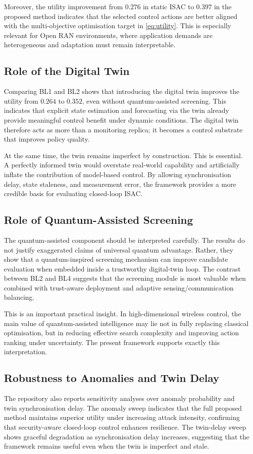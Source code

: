 \documentclass[10pt,journal]{IEEEtran}
\begin{document}
Moreover, the utility improvement from \(0.276\) in static ISAC to \(0.397\) in the proposed method indicates that the selected control actions are better aligned with the multi-objective optimisation target in \eqref{eq:utility}. This is especially relevant for Open RAN environments, where application demands are heterogeneous and adaptation must remain interpretable.

\subsection{Role of the Digital Twin}
Comparing BL1 and BL2 shows that introducing the digital twin improves the utility from \(0.264\) to \(0.352\), even without quantum-assisted screening. This indicates that explicit state estimation and forecasting via the twin already provide meaningful control benefit under dynamic conditions. The digital twin therefore acts as more than a monitoring replica; it becomes a control substrate that improves policy quality.

At the same time, the twin remains imperfect by construction. This is essential. A perfectly informed twin would overstate real-world capability and artificially inflate the contribution of model-based control. By allowing synchronisation delay, state staleness, and measurement error, the framework provides a more credible basis for evaluating closed-loop ISAC.

\subsection{Role of Quantum-Assisted Screening}
The quantum-assisted component should be interpreted carefully. The results do not justify exaggerated claims of universal quantum advantage. Rather, they show that a quantum-inspired screening mechanism can improve candidate evaluation when embedded inside a trustworthy digital-twin loop. The contrast between BL2 and BL4 suggests that the screening module is most valuable when combined with trust-aware deployment and adaptive sensing/communication balancing.

This is an important practical insight. In high-dimensional wireless control, the main value of quantum-assisted intelligence may lie not in fully replacing classical optimisation, but in reducing effective search complexity and improving action ranking under uncertainty. The present framework supports exactly this interpretation.

\subsection{Robustness to Anomalies and Twin Delay}
The repository also reports sensitivity analyses over anomaly probability and twin synchronisation delay. The anomaly sweep indicates that the full proposed method maintains superior utility under increasing attack intensity, confirming that security-aware closed-loop control enhances resilience. The twin-delay sweep shows graceful degradation as synchronisation delay increases, suggesting that the framework remains useful even when the twin is imperfect and stale.
\end{document}

